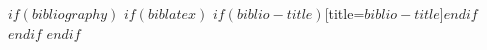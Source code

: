 $if(bibliography)$
$if(biblatex)$
\printbibliography$if(biblio-title)$[title=$biblio-title$]$endif$
$endif$
$endif$
